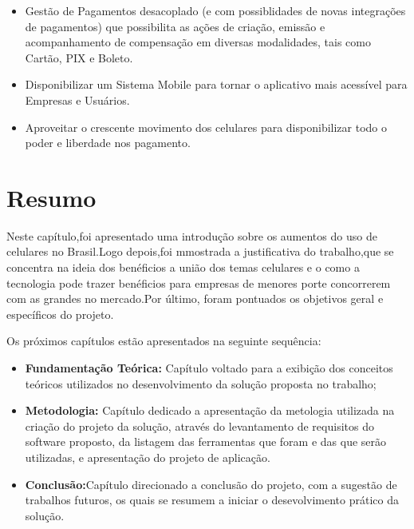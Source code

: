 \documentclass[a4paper,12pt]{article}
\begin{document}
\begin{itemize}
    \item Gestão de Pagamentos desacoplado (e com possiblidades de novas integrações de pagamentos) que possibilita as ações de criação, emissão e acompanhamento de compensação em diversas modalidades, tais como Cartão, PIX e Boleto.
    \item Disponibilizar um Sistema Mobile para tornar o aplicativo mais acessível para Empresas e  Usuários.
    \item Aproveitar o crescente movimento dos celulares para disponibilizar todo o poder e liberdade nos pagamento.
\end{itemize}

\section*{Resumo}
\hspace{0.5cm}Neste capítulo,foi apresentado uma introdução sobre os aumentos do uso de celulares no Brasil.Logo depois,foi mmostrada a justificativa do trabalho,que se concentra na ideia dos benéficios a união  dos temas celulares e o como a tecnologia pode trazer benéficios para empresas de menores porte concorrerem com as grandes no mercado.Por
último, foram pontuados os objetivos geral e específicos do projeto.

\hspace{0.5cm}Os próximos capítulos estão apresentados na seguinte sequência:

\begin{itemize}
    \item \textbf{Fundamentação Teórica:} Capítulo voltado para a exibição dos conceitos teóricos
          utilizados no desenvolvimento da solução proposta no trabalho;
    \item \textbf{Metodologia:} Capítulo dedicado a apresentação da metologia utilizada na criação
          do projeto da solução, através do levantamento de requisitos do software proposto,
          da listagem das ferramentas que foram e das que serão utilizadas, e apresentação do
          projeto de aplicação.
    \item \textbf{Conclusão:}Capítulo direcionado a conclusão do projeto, com a sugestão de trabalhos
          futuros, os quais se resumem a iniciar o desevolvimento prático da solução.
\end{itemize}
\end{document}
